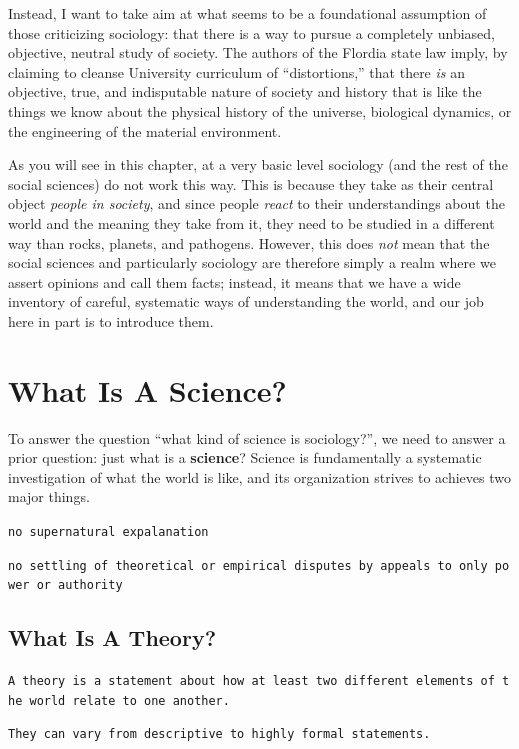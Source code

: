 \documentclass[
  letterpaper,
  DIV=11,
  numbers=noendperiod,
  oneside]{scrartcl}
\begin{document}
Instead, I want to take aim at what seems to be a foundational
assumption of those criticizing sociology: that there is a way to pursue
a completely unbiased, objective, neutral study of society. The authors
of the Flordia state law imply, by claiming to cleanse University
curriculum of ``distortions,'' that there \emph{is} an objective, true,
and indisputable nature of society and history that is like the things
we know about the physical history of the universe, biological dynamics,
or the engineering of the material environment.

As you will see in this chapter, at a very basic level sociology (and
the rest of the social sciences) do not work this way. This is because
they take as their central object \emph{people in society}, and since
people \emph{react} to their understandings about the world and the
meaning they take from it, they need to be studied in a different way
than rocks, planets, and pathogens. However, this does \emph{not} mean
that the social sciences and particularly sociology are therefore simply
a realm where we assert opinions and call them facts; instead, it means
that we have a wide inventory of careful, systematic ways of
understanding the world, and our job here in part is to introduce them.

\section{What Is A Science?}\label{what-is-a-science}

To answer the question ``what kind of science is sociology?'', we need
to answer a prior question: just what is a \textbf{science}? Science is
fundamentally a systematic investigation of what the world is like, and
its organization strives to achieves two major things.

\texttt{no\ supernatural\ expalanation}

\texttt{no\ settling\ of\ theoretical\ or\ empirical\ disputes\ by\ appeals\ to\ only\ power\ or\ authority}

\subsection{What Is A Theory?}\label{what-is-a-theory}

\texttt{A\ theory\ is\ a\ statement\ about\ how\ at\ least\ two\ different\ elements\ of\ the\ world\ relate\ to\ one\ another.}

\texttt{They\ can\ vary\ from\ descriptive\ to\ highly\ formal\ statements.}
\end{document}
